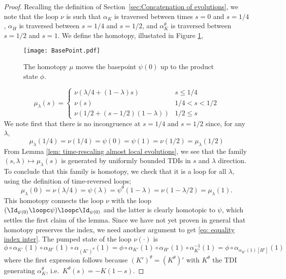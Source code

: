 \begin{proof}
	Recalling the definition of Section~\ref{sec:Concatenation of evolutions}, we note that the loop $\nu$ is such that  ${\alpha_{K}}$ is traversed between times $s=0$ and $s=1/4$, $\alpha_{H}$ is traversed between $s=1/4$ and $s=1/2$, and ${\alpha^\theta_{K}}$ is traversed between $s=1/2$ and $s=1$. We define the homotopy, illustated in   Figure \ref{fig: homotopytoproductbase}, 
	\begin{figure}[h] 
		\begin{center}
			\texttt{[image: BasePoint.pdf]}
			\caption{The homotopy $\mu$ moves the basepoint $\psi(0)$ up to the product state $\phi$.}
			\label{fig: homotopytoproductbase}
		\end{center}
	\end{figure}
	$$
	\mu_\lambda(s) = \begin{cases}  \nu(\lambda/4+(1-\lambda)s )  &   s\leq 1/4 \\
	\nu(s)&   1/4 < s < 1/2 \\
	\nu(1/2 + (s-1/2)(1-\lambda) )   &     1/2\leq s
	\end{cases}
	$$
	We note first that there is no incongruence at $s=1/4$ and $s=1/2$ since, for any $\lambda$, 
	$$
	\mu_\lambda(1/4)= \nu(1/4 ) = \psi(0)=\psi(1)=   \nu(1/2 ) =  \mu_\lambda(1/2)
	$$
	From Lemma \ref{lem: time-rescaling almost local evolutions}, we see that the family $(s,\lambda)\mapsto \mu_\lambda(s)$ is generated by uniformly bounded TDIs in $s$ and $\lambda$ direction. To conclude that this family is homotopy, we check that it is a loop for all $\lambda$, using the definition of time-reversed loops;
	$$
	\mu_\lambda(0) =\nu(\lambda/4 )=\psi(\lambda) ={\psi^\theta}(1-\lambda)= \nu(1-\lambda/2)=         \mu_\lambda(1). $$
	This homotopy connects the loop $\nu$ with the loop $(\Id_{\psi(0)} \loopc \psi) \loopc  \Id_{\psi(0)}$ and the latter is clearly homotopic to $\psi$, which settles the first claim of the lemma. 
	Since we have not yet proven in general that homotopy preserves the index,  we need another argument to get \eqref{eq: equality index inter}.  The pumped state of the loop $\nu(\cdot)$ is
	\begin{equation}\label{Complicated Pumped State}
	\phi \circ   \alpha_{K'}(1)\circ \alpha_{H'}(1) \circ \alpha_{(K')^\theta}(1)=  
	\phi \circ   \alpha_{K'}(1)\circ \alpha_{H'}(1) \circ  \alpha_{K'}^{-1}(1) = 
	\phi \circ \alpha_{\alpha_{K'}(1)[H']}(1) 
	\end{equation}
	where the first expression follows because  $(K')^\theta=(K^\theta)'$ with $K^\theta$ the TDI generating ${\alpha^\theta_K}$, i.e.\ ${K^\theta(s)}=-K(1-s)$. 

\end{proof}
